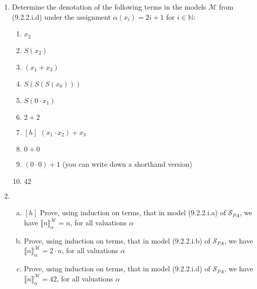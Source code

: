 	\begin{enumerate}[\thesection.1]
	
			\item Determine the denotation of the following terms in the models $\mathcal{M}$ from (9.2.2.i.d) under the assignment $\alpha(x_i)=2i+1$ for $i\in\mathbb{N}$:
			
			\begin{enumerate}
			
				\item $x_2$
				
				\item $S(x_2)$
				
				\item $(x_1+x_3)$
				
				\item $S(S(S(x_0)))$
				
				\item $S(0\cdot x_1)$
				
				\item $2+2$
				
				\item $[h]$ $(x_1\cdot x_2)+x_3$

				\item $0+0$
				
				\item $(0\cdot 0)+1$ (you can write down a shorthand version)
				
				\item $42$
			
			\end{enumerate}
			
			\item \begin{enumerate}[(a)]

		
			\item $[h]$ Prove, using induction on terms, that in model (9.2.2.i.a) of $\mathcal{S}_{PA}$, we have $\llbracket n\rrbracket^\mathcal{M}_\alpha=n$, for all valuations $\alpha$
						
			\item Prove, using induction on terms, that in model (9.2.2.i.b) of $\mathcal{S}_{PA}$, we have $\llbracket n\rrbracket^\mathcal{M}_\alpha=2\cdot n$, for all valuations $\alpha$

			\item Prove, using induction on terms, that in model (9.2.2.i.d) of $\mathcal{S}_{PA}$, we have $\llbracket n\rrbracket^\mathcal{M}_\alpha=42$, for all valuations $\alpha$
			

\end{enumerate}
\end{enumerate}
